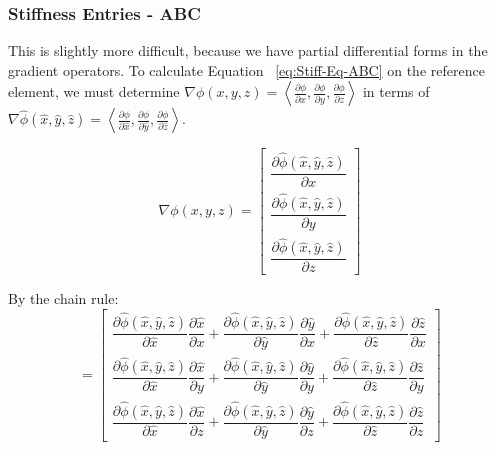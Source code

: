 \subsubsection{Stiffness Entries - ABC}

This is slightly more difficult, because we have partial differential forms in the gradient operators. To calculate Equation ~\ref{eq:Stiff-Eq-ABC} on the reference element, we must determine $\nabla \phi(x,y,z) = \left<\frac{\partial \phi}{\partial x}, \frac{\partial \phi}{\partial y}, \frac{\partial \phi}{\partial z}\right>$ in terms of $\nabla \hat{\phi}(\hat{x}, \hat{y}, \hat{z}) = \left<\frac{\partial \phi}{\partial \hat{x}}, \frac{\partial \phi}{\partial \hat{y}}, \frac{\partial \phi}{\partial \hat{z}}\right>$.

\begin{equation}
\nabla \phi(x,y,z) = \begin{bmatrix}
\dfrac{\partial \hat{\phi}(\hat{x}, \hat{y}, \hat{z})}{\partial x} \\
\dfrac{\partial \hat{\phi}(\hat{x}, \hat{y}, \hat{z})}{\partial y} \\
\dfrac{\partial \hat{\phi}(\hat{x}, \hat{y}, \hat{z})}{\partial z}
\end{bmatrix}
\end{equation}

By the chain rule:
\begin{equation}
= \begin{bmatrix}
\dfrac{\partial \hat{\phi}(\hat{x}, \hat{y}, \hat{z})}{\partial \hat{x}} \dfrac{\partial \hat{x}}{\partial x} + \dfrac{\partial \hat{\phi}(\hat{x}, \hat{y}, \hat{z})}{\partial \hat{y}} \dfrac{\partial \hat{y}}{\partial x} + \dfrac{\partial \hat{\phi}(\hat{x}, \hat{y}, \hat{z})}{\partial \hat{z}} \dfrac{\partial \hat{z}}{\partial x} \\
\dfrac{\partial \hat{\phi}(\hat{x}, \hat{y}, \hat{z})}{\partial \hat{x}} \dfrac{\partial \hat{x}}{\partial y} + \dfrac{\partial \hat{\phi}(\hat{x}, \hat{y}, \hat{z})}{\partial \hat{y}} \dfrac{\partial \hat{y}}{\partial y} + \dfrac{\partial \hat{\phi}(\hat{x}, \hat{y}, \hat{z})}{\partial \hat{z}} \dfrac{\partial \hat{z}}{\partial y} \\
\dfrac{\partial \hat{\phi}(\hat{x}, \hat{y}, \hat{z})}{\partial \hat{x}} \dfrac{\partial \hat{x}}{\partial z} + \dfrac{\partial \hat{\phi}(\hat{x}, \hat{y}, \hat{z})}{\partial \hat{y}} \dfrac{\partial \hat{y}}{\partial z} + \dfrac{\partial \hat{\phi}(\hat{x}, \hat{y}, \hat{z})}{\partial \hat{z}} \dfrac{\partial \hat{z}}{\partial z}
\end{bmatrix} 
\end{equation}

